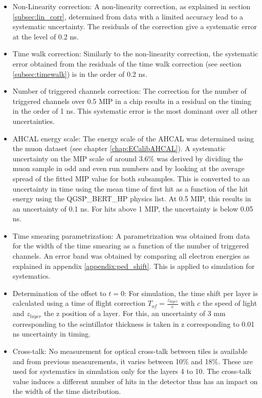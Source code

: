 \begin{itemize}
	\item Non-Linearity correction: A non-linearity correction, as explained in section \ref{subsec:lin_corr}, determined from data with a limited accuracy lead to a systematic uncertainty. The residuals of the correction give a systematic error at the level of 0.2 ns.
	\item Time walk correction: Similarly to the non-linearity correction, the systematic error obtained from the residuals of the time walk correction (see section \ref{subsec:timewalk}) is in the order of 0.2 ns.
	\item Number of triggered channels correction: The correction for the number of triggered channels over 0.5 MIP in a chip results in a residual on the timing in the order of 1 ns. This systematic error is the most dominant over all other uncertainties.
	\item AHCAL energy scale: The energy scale of the AHCAL was determined using the muon dataset (see chapter \ref{chap:ECalibAHCAL}). A systematic uncertainty on the MIP scale of around 3.6\% was derived by dividing the muon sample in odd and even run numbers and by looking at the average spread of the fitted MIP value for both subsamples. This is converted to an uncertainty in time using the mean time of first hit as a function of the hit energy using the QGSP\_BERT\_HP physics list. At 0.5 MIP, this results in an uncertainty of 0.1 ns. For hits above 1 MIP, the uncertainty is below 0.05 ns.
	\item Time smearing parametrization: A parametrization was obtained from data for the width of the time smearing as a function of the number of triggered channels. An error band was obtained by comparing all electron energies as explained in appendix \ref{appendix:ped_shift}. This is applied to simulation for systematics.
	\item Determination of the offset to $t=0$: For simulation, the time shift per layer is calculated using a time of flight correction $T_{of} = \frac{z_{layer}}{c}$ with $c$ the speed of light and $z_{layer}$ the z position of a layer. For this, an uncertainty of 3 mm corresponding to the scintillator thickness is taken in z corresponding to 0.01 ns uncertainty in timing.
	\item Cross-talk: No measurement for optical cross-talk between tiles is available and from previous measurements, it varies between 10\% and 18\%. These are used for systematics in simulation only for the layers 4 to 10. The cross-talk value induces a different number of hits in the detector thus has an impact on the width of the time distribution.

\end{itemize}
